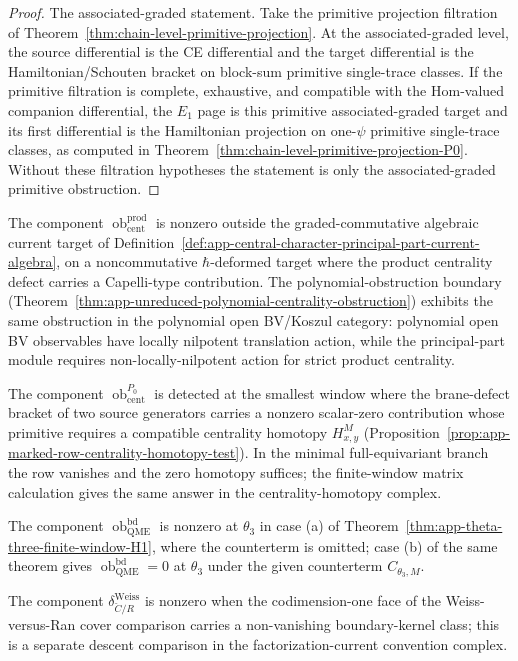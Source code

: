 \begin{proof}
  The associated-graded statement.  Take the primitive projection
  filtration of Theorem~\ref{thm:chain-level-primitive-projection}.
  At the associated-graded level, the source differential is the
  CE differential and the target differential is the
	  Hamiltonian/Schouten bracket on block-sum primitive single-trace
	  classes.  If the primitive filtration is complete, exhaustive, and compatible
  with the Hom-valued companion differential, the \(E_1\) page is this
  primitive associated-graded target and its first differential is the
	  Hamiltonian projection on one-\(\psi\) primitive single-trace classes, as
  computed in Theorem~\ref{thm:chain-level-primitive-projection-P0}.
  Without these filtration hypotheses the statement is only the
  associated-graded primitive obstruction.
\end{proof}

\begin{rmk}
\label{rmk:app-cotangent-lift-first-nontrivial-occurrence}
  The component
  \(\operatorname{ob}^{\mathrm{prod}}_{\mathrm{cent}}\) is nonzero
  outside the graded-commutative algebraic current target of
  Definition~\ref{def:app-central-character-principal-part-current-algebra},
  on a noncommutative \(\hbar\)-deformed target where the product
  centrality defect carries a Capelli-type contribution.  The
  polynomial-obstruction boundary
  (Theorem~\ref{thm:app-unreduced-polynomial-centrality-obstruction})
  exhibits the same obstruction in the polynomial open BV/Koszul
  category: polynomial open BV observables have locally nilpotent
  translation action, while the principal-part module requires
  non-locally-nilpotent action for strict product centrality.

  The component \(\operatorname{ob}^{P_0}_{\mathrm{cent}}\) is
  detected at the smallest window where the brane-defect bracket of
  two source generators carries a nonzero scalar-zero contribution whose
  primitive requires a compatible centrality homotopy
  \(H^M_{x,y}\)
  (Proposition~\ref{prop:app-marked-row-centrality-homotopy-test}).
  In the minimal full-equivariant branch the row vanishes and the
  zero homotopy suffices; the finite-window matrix calculation gives
  the same answer in the centrality-homotopy complex.

  The component \(\operatorname{ob}^{\mathrm{bd}}_{\mathrm{QME}}\) is
  nonzero at \(\theta_3\) in case (a) of
  Theorem~\ref{thm:app-theta-three-finite-window-H1}, where the
  counterterm is omitted; case (b) of the same theorem gives
  \(\operatorname{ob}^{\mathrm{bd}}_{\mathrm{QME}}=0\) at
  \(\theta_3\) under the given counterterm
  \(C_{\theta_3,M}\).

  The component \(\delta^{\mathrm{Weiss}}_{\check C/R}\) is nonzero
  when the codimension-one face of the Weiss-versus-Ran cover
  comparison carries a non-vanishing boundary-kernel class; this is a
  separate descent comparison in the factorization-current convention
  complex.
\end{rmk}
